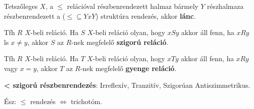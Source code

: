 \documentclass{beamer}
\newcommand{\mmedskip}{\vspace{0.5em}}
\begin{document}
\begin{frame}
\begin{tcolorbox}[title={Def.: Szigorú, gyenge reláció, Lánc}]
Tetszőleges $X$, a $\leq$ relációval részbenrendezett halmaz bármely $Y$ részhalmaza részbenrendezett a ($\leq \subseteq Y x Y$) struktúra rendezés, akkor \textbf{lánc}.\\
\mmedskip

Tfh $R$ $X$-beli reláció. Ha $S$ $X$-beli reláció olyan, hogy $xSy$ akkor áll fenn, ha $xRy$ ls $x \neq y$, akkor $S$ az $R$-nek megfelelő \textbf{szigorú reláció}.\\
\mmedskip

Tfh $R$ $X$-beli reláció. Ha $T$ $X$-beli reláció olyan, hogy $xTy$ akkor áll fenn, ha $xRy$ vagy $x = y$, akkor $T$ az $R$-nek megfelelő \textbf{gyenge reláció}.\\
\mmedskip

\textbf{< szigorú részbenrendezés}: Irreflexív, Tranzitív, Szigorúan Antiszimmetrikus.\\
\mmedskip

Ész: $\leq$ rendezés $\iff$ trichotóm.
\end{tcolorbox}
\end{frame}
\end{document}
